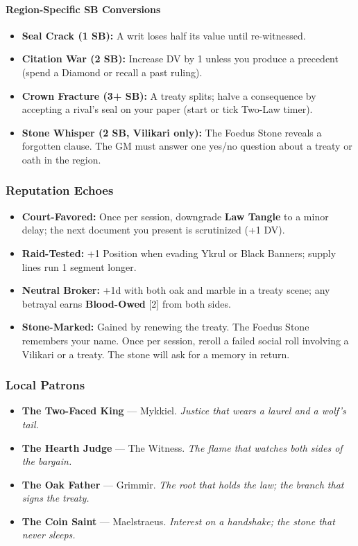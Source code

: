 \paragraph{Region-Specific SB Conversions}
\begin{itemize}[nosep]
  \item \textbf{Seal Crack (1 SB):} A writ loses half its value until re-witnessed.
  \item \textbf{Citation War (2 SB):} Increase DV by 1 unless you produce a precedent (spend a Diamond or recall a past ruling).
  \item \textbf{Crown Fracture (3+ SB):} A treaty splits; halve a consequence by accepting a rival's seal on your paper (start or tick Two-Law timer).
  \item \textbf{Stone Whisper (2 SB, Vilikari only):} The Foedus Stone reveals a forgotten clause. The GM must answer one yes/no question about a treaty or oath in the region.
\end{itemize}

\subsubsection{Reputation Echoes}

\begin{itemize}[nosep]
  \item \textbf{Court-Favored:} Once per session, downgrade \textbf{Law Tangle} to a minor delay; the next document you present is scrutinized (+1 DV).
  \item \textbf{Raid-Tested:} +1 Position when evading Ykrul or Black Banners; supply lines run 1 segment longer.
  \item \textbf{Neutral Broker:} +1d with both oak and marble in a treaty scene; any betrayal earns \textbf{Blood-Owed} [2] from both sides.
  \item \textbf{Stone-Marked:} Gained by renewing the treaty. The Foedus Stone remembers your name. Once per session, reroll a failed social roll involving a Vilikari or a treaty. The stone will ask for a memory in return.
\end{itemize}

\subsubsection{Local Patrons}

\begin{itemize}[nosep]
  \item \textbf{The Two-Faced King} --- Mykkiel. \textit{Justice that wears a laurel and a wolf's tail.}
  \item \textbf{The Hearth Judge} --- The Witness. \textit{The flame that watches both sides of the bargain.}
  \item \textbf{The Oak Father} --- Grimmir. \textit{The root that holds the law; the branch that signs the treaty.}
  \item \textbf{The Coin Saint} --- Maelstraeus. \textit{Interest on a handshake; the stone that never sleeps.}
\end{itemize}

